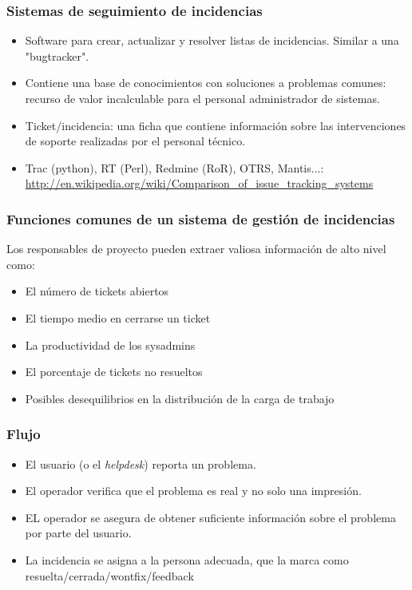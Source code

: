 \documentclass{beamer}
\begin{document}
\begin{frame}
\frametitle{Sistemas de seguimiento de incidencias}

\begin{itemize}
\item Software para crear, actualizar y resolver listas de incidencias. Similar a una 
"bugtracker". 
\item Contiene una base de conocimientos con soluciones a problemas comunes: recurso de valor incalculable para el personal administrador de sistemas. 
\item \alert{Ticket/incidencia:} una ficha que contiene información sobre las intervenciones de soporte realizadas por el personal técnico. 
\item Trac (python), RT (Perl), Redmine (RoR), OTRS, Mantis...: \url{http://en.wikipedia.org/wiki/Comparison_of_issue_tracking_systems}
\end{itemize}
\end{frame}



\begin{frame}
\frametitle{Funciones comunes de un sistema de gestión de incidencias}

Los responsables de proyecto pueden extraer valiosa información de alto nivel como:

\begin{itemize}
\item El número de tickets abiertos 
\item El tiempo medio en cerrarse un ticket
\item La productividad de los sysadmins
\item El porcentaje de tickets no resueltos
\item Posibles desequilibrios en la distribución de la carga de trabajo

\end{itemize}
\end{frame}



\begin{frame}
\frametitle{Flujo}

\begin{itemize}
\item El usuario (o el \textit{helpdesk}) reporta un problema.
\item El operador verifica que el problema es real y no solo una impresión.
\item EL operador se asegura de obtener suficiente información sobre el problema por parte del usuario.
\item La incidencia se asigna a la persona adecuada, que la marca como resuelta/cerrada/wontfix/feedback

\end{itemize}
\end{frame}
\end{document}
